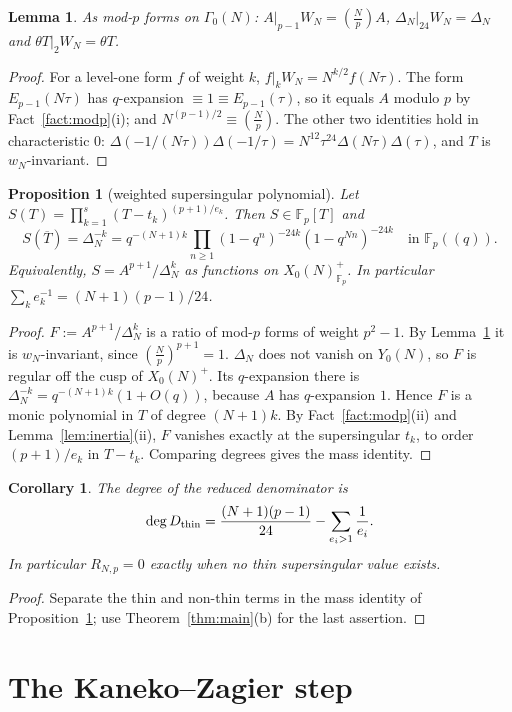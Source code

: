 \documentclass[11pt,a4paper]{article}
\numberwithin{equation}{section}
\newtheorem{proposition}[theorem]{Proposition}
\newtheorem{lemma}[theorem]{Lemma}
\newtheorem{corollary}[theorem]{Corollary}
\theoremstyle{definition}
\theoremstyle{remark}
\newcommand{\Fp}{\mathbb F_p}
\newcommand{\Lp}[1]{\left(\frac{#1}{p}\right)}
\begin{document}
\begin{lemma}\label{lem:AW}
As mod-$p$ forms on $\Gamma_0(N)$: $A|_{p-1}W_N=\Lp{N}A$, $\Delta_N|_{24}W_N=\Delta_N$ and
$\theta T|_2W_N=\theta T$.
\end{lemma}
\begin{proof}
For a level-one form $f$ of weight $k$, $f|_kW_N=N^{k/2}f(N\tau)$. The form $E_{p-1}(N\tau)$ has
$q$-expansion $\equiv1\equiv E_{p-1}(\tau)$, so it equals $A$ modulo $p$ by Fact~\ref{fact:modp}(i);
and $N^{(p-1)/2}\equiv\Lp N$. The other two identities hold in characteristic $0$:
$\Delta(-1/(N\tau))\Delta(-1/\tau)=N^{12}\tau^{24}\Delta(N\tau)\Delta(\tau)$, and $T$ is
$w_N$-invariant.
\end{proof}

\begin{proposition}[weighted supersingular polynomial]\label{prop:S}
Let $S(T)=\prod_{k=1}^s(T-t_k)^{(p+1)/e_k}$. Then $S\in\Fp[T]$ and
\[
S(\overline T)=\Delta_N^{-k}=q^{-(N+1)k}\prod_{n\ge1}(1-q^n)^{-24k}(1-q^{Nn})^{-24k}\quad\text{in }\Fp((q)).
\]
Equivalently, $S=A^{p+1}/\Delta_N^{k}$ as functions on $X_0(N)^+_{\Fp}$. In particular
$\sum_k e_k^{-1}=(N+1)(p-1)/24$.
\end{proposition}
\begin{proof}
$F:=A^{p+1}/\Delta_N^k$ is a ratio of mod-$p$ forms of weight $p^2-1$. By Lemma~\ref{lem:AW} it is
$w_N$-invariant, since $\Lp N^{p+1}=1$. $\Delta_N$ does not vanish on $Y_0(N)$, so $F$ is regular off the cusp of
$X_0(N)^+$. Its $q$-expansion there is $\Delta_N^{-k}=q^{-(N+1)k}(1+O(q))$, because $A$ has
$q$-expansion $1$. Hence $F$ is a monic polynomial in $T$ of degree $(N+1)k$. By
Fact~\ref{fact:modp}(ii) and Lemma~\ref{lem:inertia}(ii), $F$ vanishes exactly at the supersingular
$t_k$, to order $(p+1)/e_k$ in $T-t_k$. Comparing degrees gives the mass identity.
\end{proof}

\begin{corollary}\label{cor:degree}
The degree of the reduced denominator is
\[
\deg D_{\rm thin}=\frac{(N+1)(p-1)}{24}-\sum_{e_i>1}\frac1{e_i}.
\]
In particular $R_{N,p}=0$ exactly when no thin supersingular value exists.
\end{corollary}
\begin{proof}
Separate the thin and non-thin terms in the mass identity of
Proposition~\ref{prop:S}; use Theorem~\ref{thm:main}(b) for the last assertion.
\end{proof}

\section{The Kaneko--Zagier step}\label{sec:kz}
\end{document}
